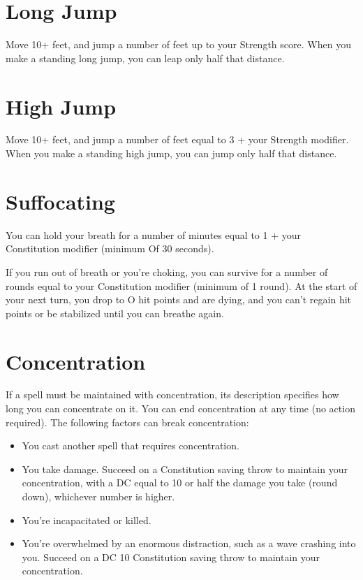 \documentclass[10pt,a4paper,twoside,bg=print,twocolumn,openany,nodeprecatedcode]{dndbook}
\begin{document}
\section{Long Jump}
Move 10+ feet, and jump a number of feet up to your Strength score. When you make a standing long jump, you can leap only half that distance.

\section{High Jump}
Move 10+ feet, and jump a number of feet equal to 3 + your Strength modifier. When you make a standing high jump, you can jump only half that distance.

\section{Suffocating}
You can hold your breath for a number of minutes equal to 1 + your Constitution modifier (minimum Of 30 seconds).

If you run out of breath or you're choking, you can survive for a number of rounds equal to your Constitution modifier (minimum of 1 round). At the start of your next turn, you drop to O hit points and are dying, and you can't regain hit points or be stabilized until you can breathe again.

\section{Concentration}
If a spell must be maintained with concentration, its description specifies how long you can concentrate on it. You can end concentration at any time (no action required). The following factors can break concentration:


\begin{itemize}
\item You cast another spell that requires concentration.
\item You take damage. Succeed on a Constitution saving throw to maintain your concentration, with a DC equal to 10 or half the damage you take (round down), whichever number is higher.
\item You're incapacitated or killed.
\item You're overwhelmed by an enormous distraction, such as a wave crashing into you. Succeed on a DC 10 Constitution saving throw to maintain your concentration.
\end{itemize}
\end{document}
